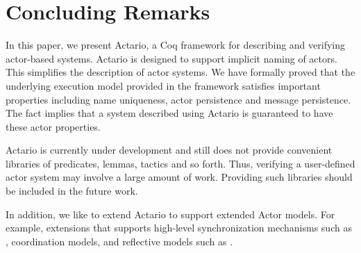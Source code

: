 \section{Concluding Remarks}
\label{sec:conclusion}

In this paper, we present Actario, a Coq framework for describing and
verifying actor-based systems. Actario is designed to support implicit
naming of actors. This simplifies the description of actor systems.
We have formally proved that the underlying execution model provided
in the framework satisfies important properties including name
uniqueness, actor persistence and message persistence.  The fact
implies that a system described using Actario is guaranteed to have
these actor properties.

Actario is currently under development and still does not provide
convenient libraries of predicates, lemmas, tactics and so
forth. Thus, verifying a user-defined actor system may involve a large
amount of work. Providing such libraries should be included in the
future work.

In addition, we like to extend Actario to support extended Actor
models. For example, extensions that supports high-level
synchronization mechanisms such as \cite{De-Koster:2012aa},
coordination models\cite{Talcott:2011aa}, and reflective models such
as \cite{Watanabe:2013aa}.
